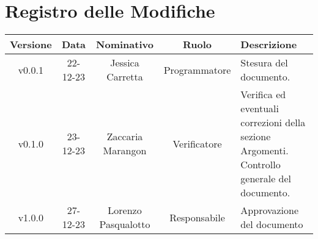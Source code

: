 \section*{\Large Registro delle Modifiche}
    \begin{table}[h]
        \centering
        \renewcommand\tabularxcolumn[1]{m{#1}} %
        \renewcommand{\arraystretch}{1.5}
        \begin{tabularx}{0.98\textwidth}
            {c|c|c|c|>{\centering\arraybackslash}X}
            \rowcolor{black}
            \textbf{\color{white} Versione} & \textbf{\color{white} Data} & \textbf{\color{white} Nominativo} & \textbf{\color{white} Ruolo} & \textbf{\color{white} Descrizione} \\ 
            \hline

            v0.0.1 & 22-12-23 & Jessica Carretta & Programmatore & Stesura del documento. \\
            v0.1.0 & 23-12-23 & Zaccaria Marangon & Verificatore & Verifica ed eventuali correzioni della sezione Argomenti. Controllo generale del documento.  \\
            v1.0.0 & 27-12-23 & Lorenzo Pasqualotto & Responsabile & Approvazione del documento\\
            \hline
        \end{tabularx}
    \end{table}